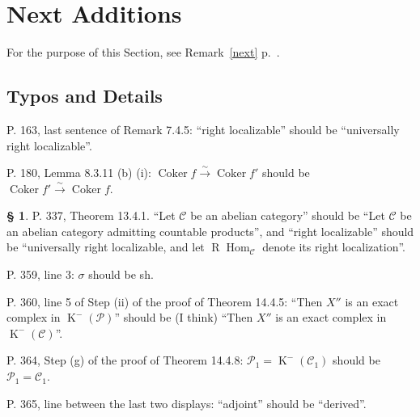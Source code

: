 \documentclass[12pt]{article}
\theoremstyle{remark}
\theoremstyle{definition}
\newtheorem{s}[thm]{\S}
\newcommand{\cc}{\mathcal}
\newcommand{\C}{\mathcal C}
\newcommand{\mc}{\mathcal}
\newcommand{\oo}{\operatorname}
\newcommand{\xr}{\xrightarrow}
\DeclareMathOperator{\Coker}{Coker}
\DeclareMathOperator{\Hom}{Hom}%
\DeclareMathOperator{\op}{op}
\begin{document}
\section{Next Additions} %
%
For the purpose of this Section, see Remark~\ref{next} p.~\pageref{next}.
%
\subsection{Typos and Details} %
%
\noindent P. 163, last sentence of Remark 7.4.5: ``right localizable'' should be ``universally right localizable''.

\noindent P. 180, Lemma 8.3.11 (b) (i): $\Coker f\xr\sim\Coker f'$ should be $\Coker f'\xr\sim\Coker f$.

\begin{s}\label{1341}
P. 337, Theorem 13.4.1. ``Let $\C$ be an abelian category'' should be ``Let $\C$ be an abelian category admitting countable products'', and ``right localizable'' should be ``universally right localizable, and let $\oo R\Hom_\C$ denote its right localization''.
\end{s}

\noindent P. 359, line 3: $\sigma$ should be sh.


\noindent P. 360, line 5 of Step (ii) of the proof of Theorem 14.4.5: ``Then $X''$ is an exact complex in $\oo K^-(\cc P)$'' should be (I think) ``Then $X''$ is an exact complex in $\oo K^-(\cc C)$''.


\noindent P. 364, Step (g) of the proof of Theorem 14.4.8: $\mc P_1=\oo K^-(\C_1)$ should be $\mc P_1=\C_1$.

\noindent P. 365, line between the last two displays: ``adjoint'' should be ``derived''.

\end{document}
